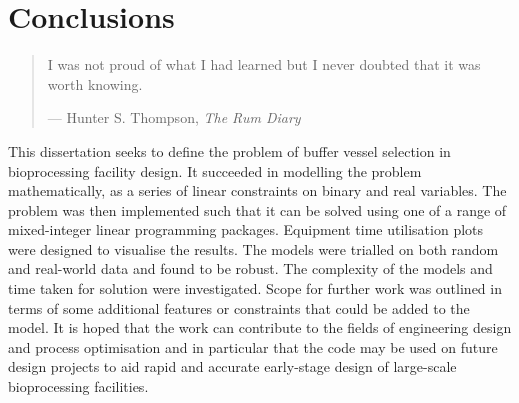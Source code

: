 %
%
%
%

\chapter{Conclusions}\label{C.conclusions}

\begin{quote}
I was not proud of what I had learned but I never doubted that it was worth
knowing.

\hspace{2cm}--- Hunter S. Thompson, \emph{The Rum Diary}
\end{quote}

This dissertation seeks to define the problem of buffer vessel selection in
bioprocessing facility design.
It succeeded in modelling the problem mathematically, as a series of linear
constraints on binary and real variables.
The problem was then implemented such that it can be solved using one of a
range of mixed-integer linear programming packages.
Equipment time utilisation plots were designed to visualise the results.
The models were trialled on both random and real-world data and found to be
robust.
The complexity of the models and time taken for solution were investigated.
Scope for further work was outlined in terms of some additional features or
constraints that could be added to the model.
It is hoped that the work can contribute to the fields of engineering design
and process optimisation and in particular that the code may be used on future
design projects to aid rapid and accurate early-stage design of large-scale
bioprocessing facilities.

